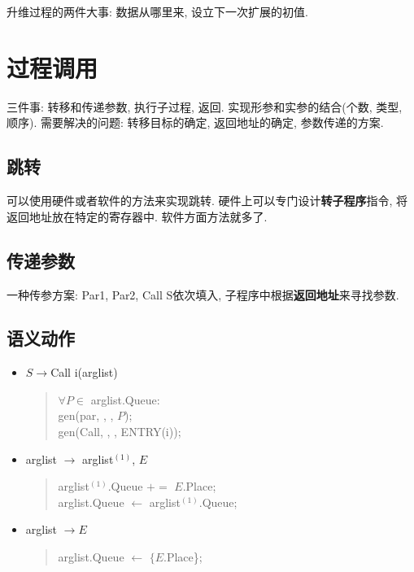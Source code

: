                     升维过程的两件大事: 数据从哪里来, 设立下一次扩展的初值.

    \section{过程调用}

        三件事: 转移和传递参数, 执行子过程, 返回. 实现形参和实参的结合(个数, 类型, 顺序). 需要解决的问题: 转移目标的确定, 返回地址的确定, 参数传递的方案.

        \subsection{跳转}
            
            可以使用硬件或者软件的方法来实现跳转. 硬件上可以专门设计\textbf{转子程序}指令, 将返回地址放在特定的寄存器中. 软件方面方法就多了.
        
        \subsection{传递参数}

            一种传参方案: Par1, Par2, Call S依次填入, 子程序中根据\textbf{返回地址}来寻找参数.

        \subsection{语义动作}

            \begin{itemize}
                \item $S\to $Call i(arglist)
                    \begin{verse}
                        $\forall P\in$ arglist.Queue: \\
                        \qquad gen(par, \uline\quad, \uline\quad, $P$); \\
                        gen(Call, \uline\quad, \uline\quad, ENTRY(i));
                    \end{verse}
                \item arglist $\to$ arglist$^{(1)}$, $E$
                    \begin{verse}
                        arglist$^{(1)}$.Queue $+=$ $E$.Place; \\
                        arglist.Queue $\gets$ arglist$^{(1)}$.Queue;
                    \end{verse}
                \item arglist $\to E$
                    \begin{verse}
                        arglist.Queue $\gets$ $\{E$.Place\};
                    \end{verse}
            \end{itemize}


